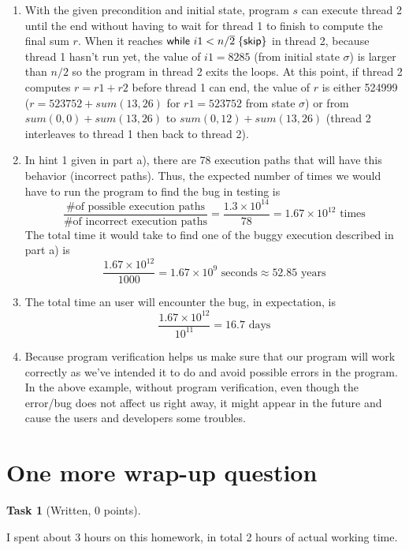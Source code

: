 \documentclass{article}
\newcommand{\stmt}[1]{\text{\sffamily #1}}
\newcommand{\const}[1]{\overline{#1}}
\newcommand{\skips}{\stmt{skip}}
\newcommand{\wrapup}[2]{I spent about #1 hours on this homework, in total #2 hours of actual working time.}
\theoremstyle{task}
\newtheorem{task}{Task}[section]
\begin{document}
\begin{enumerate}
    \item With the given precondition and initial state, program $s$ can execute
        thread 2 until the end without having to wait for thread 1 to finish
        to compute the final sum $r$. When it reaches $\stmt{while } i1 < n/\const{2}\;
        \{\skips\}$ in thread 2, because thread 1 hasn't run yet, the value of
        $i1 = 8285$ (from initial state $\sigma$) is larger than $n/2$ so the
        program in thread 2 exits the loops. At this point, if thread 2 computes
        $r = r1 + r2$ before thread 1 can end, the value of $r$ is either 524999
        ($r = 523752 + sum(13, 26)$ for $r1 = 523752$ from state $\sigma$) or
        from $sum(0, 0) + sum(13, 26)$ to $sum(0, 12) + sum(13, 26)$ (thread
        2 interleaves to thread 1 then back to thread 2).

    \item In hint 1 given in part a), there are 78 execution paths that will have
        this behavior (incorrect paths). Thus, the expected number of times
        we would have to run the program to find the bug in testing is
        \begin{equation*}
            \frac{\text{\# of possible execution paths}}{\text{\# of incorrect execution paths}}
            = \frac{1.3 \times 10^{14}}{78} = 1.67 \times 10^{12} \text{ times}
        \end{equation*}
        The total time it would take to find one of the buggy execution described
        in part a) is
        \begin{equation*}
            \frac{1.67 \times 10^{12}}{1000} = 1.67 \times 10^9 \text{ seconds} \approx 52.85 \text{ years}
        \end{equation*}
    \item The total time an user will encounter the bug, in expectation, is
        \begin{equation*}
            \frac{1.67 \times 10^{12}}{10^{11}} = 16.7 \text{ days}
        \end{equation*}
    \item Because program verification helps us make sure that our program will
        work correctly as we've intended it to do and avoid possible errors in
        the program. In the above example, without program verification, even
        though the error/bug does not affect us right away, it might appear in
        the future and cause the users and developers some troubles.
\end{enumerate}

\section{One more wrap-up question}

\begin{task}[Written, 0 points]
\end{task}
\wrapup{3}{2}
\end{document}
